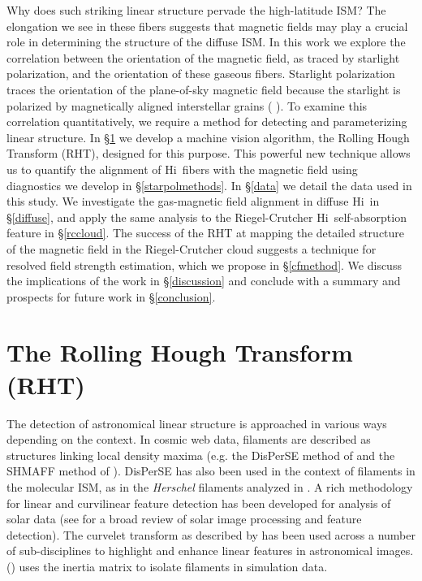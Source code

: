 \documentclass[12pt]{emulateapj}
\newcommand{\hi}{H{\sc i}~}
\newcommand{\citei}[1]{\citeauthor{#1} \citeyear{#1}}
\begin{document}
Why does such striking linear structure pervade the high-latitude ISM? The elongation we see in these fibers suggests that magnetic fields may play a crucial role in determining the structure of the diffuse ISM. In this work we explore the correlation between the orientation of the magnetic field, as traced by starlight polarization, and the orientation of these gaseous fibers. Starlight polarization traces the orientation of the plane-of-sky magnetic field because the starlight is polarized by magnetically aligned interstellar grains (\citei{Goldsmith:2008hl}). To examine this correlation quantitatively, we require a method for detecting and parameterizing linear structure. In \S \ref{rht} we develop a machine vision algorithm, the Rolling Hough Transform (RHT), designed for this purpose. This powerful new technique allows us to quantify the alignment of \hi fibers with the magnetic field using diagnostics we develop in \S\ref{starpolmethods}. In \S\ref{data} we detail the data used in this study. We investigate the gas-magnetic field alignment in diffuse \hi in \S\ref{diffuse}, and apply the same analysis to the Riegel-Crutcher \hi self-absorption feature in \S\ref{rccloud}. The success of the RHT at mapping the detailed structure of the magnetic field in the Riegel-Crutcher cloud suggests a technique for resolved field strength estimation, which we propose in \S\ref{cfmethod}. We discuss the implications of the work in \S \ref{discussion} and conclude with a summary and prospects for future work in \S \ref{conclusion}.

\section{The Rolling Hough Transform (RHT)} \label{rht}

The detection of astronomical linear structure is approached in various ways depending on the context. In cosmic web data, filaments are described as structures linking local density maxima (e.g. the DisPerSE method of \citei{Sousbie:2011ft} and the SHMAFF method of \citei{Bond:2010ct}). DisPerSE has also been used in the context of filaments in the molecular ISM, as in the \emph{Herschel} filaments analyzed in \cite{Arzoumanian:2011wu}. A rich methodology for linear and curvilinear feature detection has been developed for analysis of solar data (see \citei{Aschwanden:2009gk} for a broad review of solar image processing and feature detection). The curvelet transform as described by \citet{Starck:2003wx} has been used across a number of sub-disciplines to highlight and enhance linear features in astronomical images. \citeauthor{Hennebelle:2013ws} (\citeyear{Hennebelle:2013ws}) uses the inertia matrix to isolate filaments in simulation data.
\end{document}
